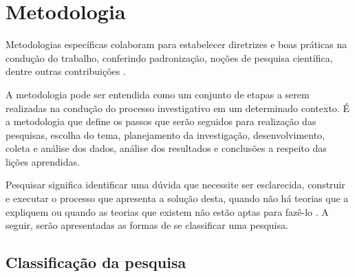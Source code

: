 \chapter{Metodologia}

Metodologias específicas colaboram para estabelecer diretrizes e boas práticas na condução do trabalho, conferindo padronização, noções de pesquisa científica, dentre outras contribuições \cite{Wohlin:2000}.

A metodologia pode ser entendida como um conjunto de etapas a serem realizadas na condução do processo investigativo em um determinado contexto. É a metodologia que define os passos que serão seguidos para realização das pesquisas, escolha do tema, planejamento da investigação, desenvolvimento, coleta e análise dos dados, análise dos resultados e conclusões a respeito das lições aprendidas\cite{Moresi:2003}.

Pesquisar significa identificar uma dúvida que necessite ser esclarecida, construir e executar o processo que apresenta a solução desta, quando não há teorias que a expliquem ou quando as teorias que existem não estão aptas para fazê-lo \cite{Koche:1997}. A seguir, serão apresentadas as formas de se classificar uma pesquisa.

\section{Classificação da pesquisa}

